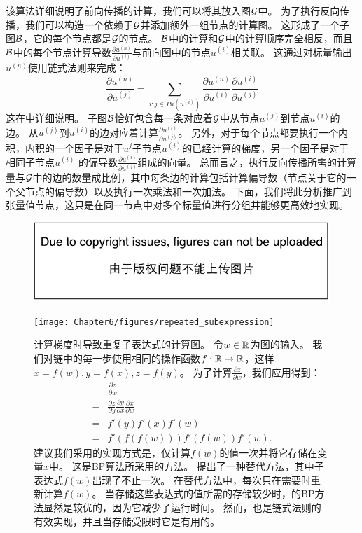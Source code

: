 
该算法详细说明了前向传播的计算，我们可以将其放入图$\mathcal{G}$中。
为了执行反向传播，我们可以构造一个依赖于$\mathcal{G}$并添加额外一组节点的计算图。
这形成了一个子图$\mathcal{B}$，它的每个节点都是$\mathcal{G}$的节点。
$\mathcal{B}$中的计算和$\mathcal{G}$中的计算顺序完全相反，而且$\mathcal{B}$中的每个节点计算导数$\frac{\partial u^{(n)}}{\partial u^{(i)}}$与前向图中的节点$u^{(i)}$相关联。
这通过对标量输出$u^{(n)}$使用链式法则来完成：
\begin{equation}
  \frac{\partial u^{(n)}}{\partial u^{(j)}} = \sum_{i:j \in Pa(u^{(i)})} \frac{\partial u^{(n)} }{ \partial u^{(i)} } \frac{ \partial u^{(i)} }{ \partial u^{(j)} }
  \label{eq:6.49}
\end{equation}
这在中详细说明。
子图$\mathcal{B}$恰好包含每一条对应着$\mathcal{G}$中从节点$u^{(j)}$到节点$u^{(i)}$的边。
从$u^{(j)}$到$u^{(i)}$的边对应着计算$\frac{\partial u^{(i)}}{\partial u^{(j)}}$。
另外，对于每个节点都要执行一个内积，内积的一个因子是对于$u^{j}$子节点$u^{(i)}$的已经计算的梯度，另一个因子是对于相同子节点$u^{(i)}$ 的偏导数$\frac{\partial u^{(i)}}{\partial u^{(j)}}$组成的向量。
总而言之，执行反向传播所需的计算量与$\mathcal{G}$中的边的数量成比例，其中每条边的计算包括计算偏导数（节点关于它的一个父节点的偏导数）以及执行一次乘法和一次加法。
下面，我们将此分析推广到张量值节点，这只是在同一节点中对多个标量值进行分组并能够更高效地实现。
\begin{figure}[!htb]
\ifOpenSource
\centerline{\includegraphics{figure.pdf}}
\else
\centerline{\texttt{[image: Chapter6/figures/repeated\_subexpression]}}
\fi
\captionsetup{singlelinecheck=off}
\caption[.]{
计算梯度时导致重复子表达式的计算图。
令$w \in \mathbb{R}$为图的输入。
我们对链中的每一步使用相同的操作函数$f: \mathbb{R} \to \mathbb{R}$，这样$x=f(w), y=f(x), z=f(y)$。
为了计算$\frac{\partial z}{\partial w}$，我们应用得到：
\begin{align}
& \frac{\partial z}{\partial w}\\
=& \frac{\partial z}{\partial y} \frac{\partial y}{\partial x} \frac{\partial x}{\partial w}\\
\label{eq:6.52}
=& f'(y)f'(x)f'(w)\\ 
\label{eq:6.53}
=& f'(f(f(w))) f'(f(w)) f'(w). 
\end{align}
建议我们采用的实现方式是，仅计算$f(w)$的值一次并将它存储在变量$x$中。
这是\gls{BP}算法所采用的方法。
提出了一种替代方法，其中子表达式$f(w)$出现了不止一次。
在替代方法中，每次只在需要时重新计算$f(w)$。
当存储这些表达式的值所需的存储较少时，的\gls{BP}方法显然是较优的，因为它减少了运行时间。
然而，也是链式法则的有效实现，并且当存储受限时它是有用的。}
\label{fig:chap6_repeated_subexpression}
\end{figure}

